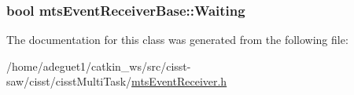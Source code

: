 \hypertarget{classmts_event_receiver_base_a962d76302ff233185a6797fed4f7052b}{
\subsubsection[{Waiting}]{\setlength{\rightskip}{0pt plus 5cm}bool mts\-Event\-Receiver\-Base\-::\-Waiting\hspace{0.3cm}{\ttfamily [protected]}}}\label{classmts_event_receiver_base_a962d76302ff233185a6797fed4f7052b}


The documentation for this class was generated from the following file\-:\begin{DoxyCompactItemize}
\item 
/home/adeguet1/catkin\-\_\-ws/src/cisst-\/saw/cisst/cisst\-Multi\-Task/\hyperlink{mts_event_receiver_8h}{mts\-Event\-Receiver.\-h}\end{DoxyCompactItemize}
